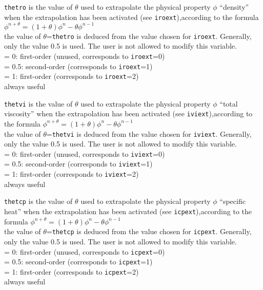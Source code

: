 {{\tt thetro} is the value of $\theta$ used to
extrapolate the physical property $\phi$ ``density'' when the extrapolation has
been activated (see {\tt iroext}),according to the
formula $\phi^{n+\theta}=(1+\theta)\phi^n-\theta \phi^{n-1}$\\
the value of $\theta$={\tt thetro} is deduced from the value chosen for
{\tt iroext}. Generally, only the value 0.5 is used. The user is not
allowed to modify this variable.\\
\hspace*{1.3cm}= 0: first-order (unused, corresponds to
{\tt iroext}=0)\\
\hspace*{1.3cm}= 0.5: second-order (corresponds to {\tt iroext}=1) \\
\hspace*{1.3cm}= 1: first-order (corresponds to {\tt iroext}=2) \\
always useful}

{{\tt thetvi} is the value of $\theta$ used to
extrapolate the physical property $\phi$ ``total viscosity'' when the extrapolation has
been activated (see {\tt iviext}),according to the
formula $\phi^{n+\theta}=(1+\theta)\phi^n-\theta \phi^{n-1}$\\
the value of $\theta$={\tt thetvi} is deduced from the value chosen for
{\tt iviext}. Generally, only the value 0.5 is used. The user is not
allowed to modify this variable.\\
\hspace*{1.3cm}= 0: first-order (unused, corresponds to
{\tt iviext}=0)\\
\hspace*{1.3cm}= 0.5: second-order (corresponds to {\tt iviext}=1) \\
\hspace*{1.3cm}= 1: first-order (corresponds to {\tt iviext}=2) \\
always useful}

{{\tt thetcp} is the value of $\theta$ used to
extrapolate the physical property $\phi$ ``specific heat'' when the extrapolation has
been activated (see {\tt icpext}),according to the
formula $\phi^{n+\theta}=(1+\theta)\phi^n-\theta \phi^{n-1}$\\
the value of $\theta$={\tt thetcp} is deduced from the value chosen for
{\tt icpext}. Generally, only the value 0.5 is used. The user is not
allowed to modify this variable.\\
\hspace*{1.3cm}= 0: first-order (unused, corresponds to
{\tt icpext}=0)\\
\hspace*{1.3cm}= 0.5: second-order (corresponds to {\tt icpext}=1) \\
\hspace*{1.3cm}= 1: first-order (corresponds to {\tt icpext}=2) \\
always useful}

